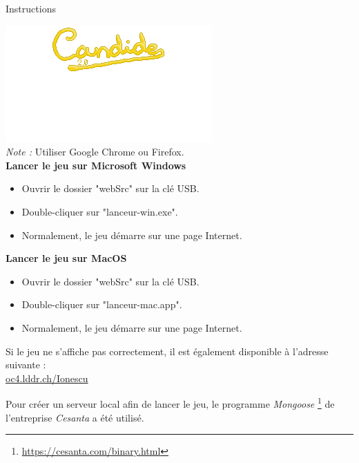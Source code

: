 \documentclass[10pt,a4paper]{article}
\begin{document}
\begin{center}
\begin{Huge}
Instructions 
\end{Huge}
\end{center}
\vspace{30pt}
\includegraphics{assets/title}\\
\centering
\textit{Note :} Utiliser Google Chrome ou Firefox.\\

\vspace{10pt}
\textbf{Lancer le jeu sur Microsoft Windows }
\begin{itemize}
\item Ouvrir le dossier "webSrc" sur la clé USB.
\item Double-cliquer sur "lanceur-win.exe".
\item Normalement, le jeu démarre sur une page Internet.
\end{itemize}

\vspace{10pt}

\textbf{Lancer le jeu sur MacOS }
\begin{itemize}
\item Ouvrir le dossier "webSrc" sur la clé USB.
\item Double-cliquer sur "lanceur-mac.app".
\item Normalement, le jeu démarre sur une page Internet.
\end{itemize}

\vspace{12pt}
Si le jeu ne s'affiche pas correctement, il est également disponible à l'adresse suivante : \\
\url{oc4.lddr.ch/Ionescu}\\
\vspace{12pt}

Pour créer un serveur local afin de lancer le jeu, le programme \textit{Mongoose }\footnote{\url{https://cesanta.com/binary.html}} de l'entreprise \textit{Cesanta} a été utilisé.
\end{document}
